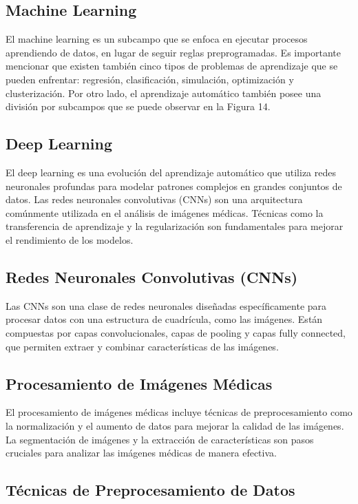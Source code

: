 \subsection{Machine Learning}

El machine learning es un subcampo que se enfoca en ejecutar procesos aprendiendo de datos, en lugar de seguir reglas preprogramadas. Es importante mencionar que existen también cinco tipos de problemas de aprendizaje que se pueden enfrentar: regresión, clasificación, simulación, optimización y clusterización. Por otro lado, el aprendizaje automático también posee una división por subcampos que se puede observar en la Figura 14.

\subsection{Deep Learning}

El deep learning es una evolución del aprendizaje automático que utiliza redes neuronales profundas para modelar patrones complejos en grandes conjuntos de datos. Las redes neuronales convolutivas (CNNs) son una arquitectura comúnmente utilizada en el análisis de imágenes médicas. Técnicas como la transferencia de aprendizaje y la regularización son fundamentales para mejorar el rendimiento de los modelos.

\subsection{Redes Neuronales Convolutivas (CNNs)}

Las CNNs son una clase de redes neuronales diseñadas específicamente para procesar datos con una estructura de cuadrícula, como las imágenes. Están compuestas por capas convolucionales, capas de pooling y capas fully connected, que permiten extraer y combinar características de las imágenes.

\subsection{Procesamiento de Imágenes Médicas}

El procesamiento de imágenes médicas incluye técnicas de preprocesamiento como la normalización y el aumento de datos para mejorar la calidad de las imágenes. La segmentación de imágenes y la extracción de características son pasos cruciales para analizar las imágenes médicas de manera efectiva.

\subsection{Técnicas de Preprocesamiento de Datos}

